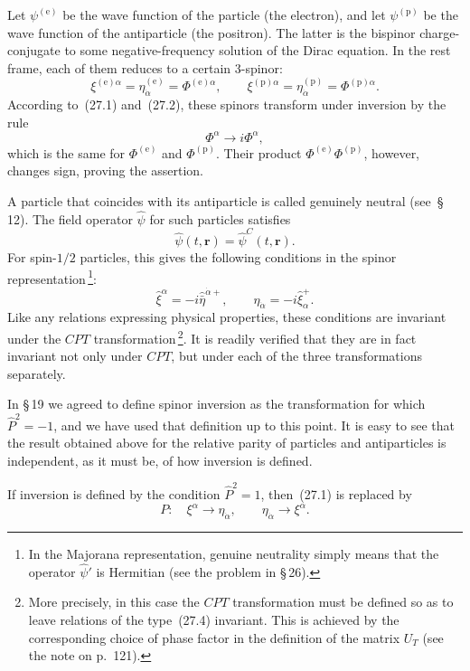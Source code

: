 Let $\psi^{(\text{e})}$ be the wave function of the particle (the electron), and let $\psi^{(\text{p})}$ be the wave function of the antiparticle (the positron). The latter is the bispinor charge-conjugate to some negative-frequency solution of the Dirac equation. In the rest frame, each of them reduces to a certain 3-spinor:
\[
\xi^{(\text{e})\alpha} = \eta^{(\text{e})}_{\dot\alpha} = \Phi^{(\text{e})\alpha},\qquad \xi^{(\text{p})\alpha} = \eta^{(\text{p})}_{\dot\alpha} = \Phi^{(\text{p})\alpha}.
\]
According to~(27.1) and~(27.2), these spinors transform under inversion by the rule
\begin{equation}
\Phi^\alpha \to i\Phi^\alpha,
\tag{27.3}
\end{equation}
which is the same for $\Phi^{(\text{e})}$ and $\Phi^{(\text{p})}$. Their product $\Phi^{(\text{e})}\Phi^{(\text{p})}$, however, changes sign, proving the assertion.

A particle that coincides with its antiparticle is called genuinely neutral (see~\S\,12). The field operator $\widehat\psi$ for such particles satisfies
\[
\widehat\psi(t,\mathbf{r}) = \widehat\psi^C(t,\mathbf{r}).
\]
For spin-$1/2$ particles, this gives the following conditions in the spinor representation\,\footnote{In the Majorana representation, genuine neutrality simply means that the operator $\widehat\psi'$ is Hermitian (see the problem in \S\,26).}:
\begin{equation}
\widehat\xi^\alpha = -i\widehat{\bar\eta}^{\dot\alpha+},\qquad \widehat\eta_{\dot\alpha} = -i\widehat\xi^+_\alpha.
\tag{27.4}
\end{equation}
Like any relations expressing physical properties, these conditions are invariant under the $CPT$ transformation\,\footnote{More precisely, in this case the $CPT$ transformation must be defined so as to leave relations of the type~(27.4) invariant. This is achieved by the corresponding choice of phase factor in the definition of the matrix $U_T$ (see the note on p.~121).}. It is readily verified that they are in fact invariant not only under $CPT$, but under each of the three transformations separately.

In \S\,19 we agreed to define spinor inversion as the transformation for which $\widehat P^2 = -1$, and we have used that definition up to this point. It is easy to see that the result obtained above for the relative parity of particles and antiparticles is independent, as it must be, of how inversion is defined.

If inversion is defined by the condition $\widehat P^2 = 1$, then~(27.1) is replaced by
\begin{equation}
P:\quad \xi^\alpha \to \eta_{\dot\alpha},\qquad \eta_{\dot\alpha} \to \xi^\alpha.
\tag{27.5}
\end{equation}

